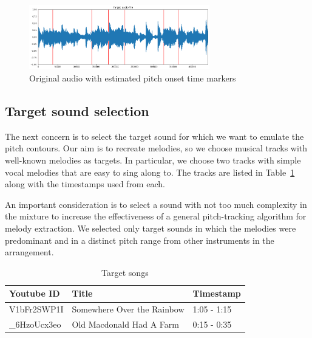 \documentclass{article}
\begin{document}
\begin{figure}[ht]
    \begin{center}
        \includegraphics[width=0.7\textwidth]{onsets}
    \end{center}
    \caption{Original audio with estimated pitch onset time markers}
    \label{onsets}
\end{figure}

\subsection{Target sound selection}

The next concern is to select the target sound for which we want to emulate the pitch contours. Our aim is to recreate melodies, so we choose musical tracks with well-known melodies as targets. In particular, we choose two tracks with simple vocal melodies that are easy to sing along to. The tracks are listed in Table~\ref{tab:target-songs} along with the timestamps used from each.

An important consideration is to select a sound with not too much complexity in the mixture to increase the effectiveness of a general pitch-tracking algorithm for melody extraction. We selected only target sounds in which the melodies were predominant and in a distinct pitch range from other instruments in the arrangement.


\begin{table}
    \begin{center}
    \begin{tabular}{@{}lll@{}}
        \toprule
        Youtube ID & Title & Timestamp \\
        \midrule
        V1bFr2SWP1I & Somewhere Over the Rainbow & 1:05 - 1:15 \\
        \_6HzoUcx3eo & Old Macdonald Had A Farm & 0:15 - 0:35 \\
        \bottomrule
    \end{tabular}
    \end{center}
    \caption{Target songs}
    \label{tab:target-songs}
\end{table}
\end{document}
